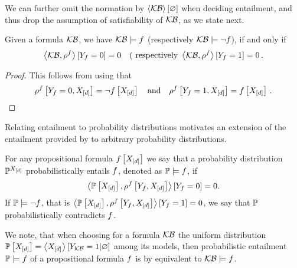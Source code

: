 We can further omit the normation by $\left\langle \mathcal{KB}\right\rangle \left[ \varnothing \right]$ when deciding entailment, and thus drop the assumption of satisfiability of $\mathcal{KB}$, as we state next.

\begin{theorem}
	Given a formula $\mathcal{KB}$, we have $\mathcal{KB}\models f$ (respectively $\mathcal{KB}\models\lnot f$), if and only if
	\begin{align*}
		\left\langle \mathcal{KB},\rho^{f}\right\rangle \left[ Y_{f}=0 \right] = 0
		 \quad \text{( respectively }
		 \left\langle \mathcal{KB},\rho^{f}\right\rangle \left[ Y_{f}=1 \right] = 0 \, .
	\end{align*}
\end{theorem}
\begin{proof}
	This follows from  using that
	\begin{align*}
		\rho^{f}\left[Y_{f}=0,X_{[d]}\right] = \lnot f\left[X_{[d]}\right] \quad \text{and} \quad \rho^{f}\left[Y_{f}=1,X_{[d]}\right] = f\left[X_{[d]}\right] \, .
	\end{align*}
\end{proof}


%
Relating entailment to probability distributions motivates an extension of the entailment provided by  to arbitrary probability distributions.

\begin{definition}\label{def:probEntailment}
	For any propositional formula $f\left[X_{[d]}\right]$ we say that a probability distribution $\mathbb{P}^{X_{[d]}}$ probabilistically entails $f$, denoted as $\mathbb{P}\models f$, if
	\begin{align*}
		 \left\langle \mathbb{P}\left[X_{[d]}\right],\rho^{f}\left[Y_{f},X_{[d]}\right]\right\rangle \left[ Y_{f}=0 \right] = 0 .
	\end{align*}
	If $\mathbb{P}\models\lnot f$, that is $\left\langle \mathbb{P}\left[X_{[d]}\right],\rho^{f}\left[Y_{f},X_{[d]}\right]\right\rangle \left[ Y_{f}=1 \right] = 0$, we say that $\mathbb{P}$ probabilistically contradicts $f$.
\end{definition}

%
We note, that when choosing for a formula $\mathcal{KB}$ the uniform distribution $\mathbb{P}\left[X_{[d]}\right]=\left\langle X_{[d]}\right\rangle \left[ Y_{\mathcal{KB}}=1 | \varnothing \right]$ among its models, then probabilistic entailment $\mathbb{P}\models f$ of a propositional formula $f$ is by  equivalent to $\mathcal{KB}\models f$.

